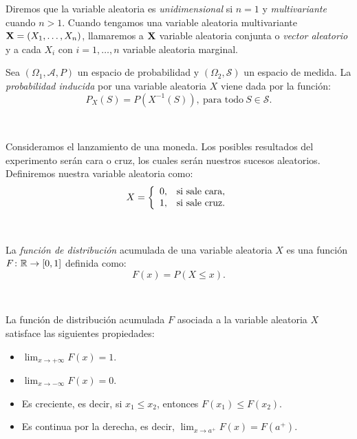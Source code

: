 \documentclass[oneside,openright,titlepage,numbers=noenddot,openany,headinclude,footinclude=true,
cleardoublepage=empty,abstractoff,BCOR=5mm,paper=a4,fontsize=12pt,main=spanish]{scrreprt}
\begin{document}
Diremos que la variable aleatoria es \textit{unidimensional} si $n=1$ y \textit{multivariante} cuando $n > 1$. Cuando tengamos una variable aleatoria multivariante $\textbf{X}=(X_1,\dots,X_n)$, llamaremos a $\textbf{X}$ variable aleatoria conjunta o \textit{vector aleatorio} y a cada $X_i$ con $i=1,\dots,n$ variable aleatoria marginal.\\


\begin{definition}
Sea $(\Omega_1, \mathcal{A},P)$ un espacio de probabilidad y $(\Omega_2, \mathcal{S})$ un espacio de medida. La \textit{probabilidad inducida} por una variable aleatoria $X$ viene dada por la función: $$P_X(S)=P(X^{-1}(S)), \ \text{para todo} \ S \in \mathcal{S}.$$
\end{definition}\

\begin{example}
Consideramos el lanzamiento de una moneda. Los posibles resultados del experimento serán cara o cruz, los cuales serán nuestros sucesos aleatorios. Definiremos nuestra variable aleatoria como: $$X= \left \{
\begin{array}{l l}
0, & \mbox{si sale cara}, \\
1, & \mbox{si sale cruz}.
\end{array}
\right.$$
\end{example}\

\begin{definition}
La \textit{función de distribución} acumulada de una variable aleatoria $X$ es una función $F\colon \mathbb{R}\to [0,1]$ definida como: $$F(x)=P(X\leq x).$$
\end{definition}\

\begin{proposition} La función de distribución acumulada $F$ asociada a la variable aleatoria $X$ satisface las siguientes propiedades:

\begin{itemize}
    \item $\displaystyle \lim_{x\to +\infty} F(x)=1$.
    \item $\displaystyle \lim_{x\to -\infty} F(x)=0$.
    \item Es creciente, es decir, si $x_1 \leq x_2$, entonces $F(x_1) \leq F(x_2)$.
    \item Es continua por la derecha, es decir, $\displaystyle \lim_{x\to a^+} F(x)=F(a^+)$.
\end{itemize}
\end{proposition}\
\end{document}

